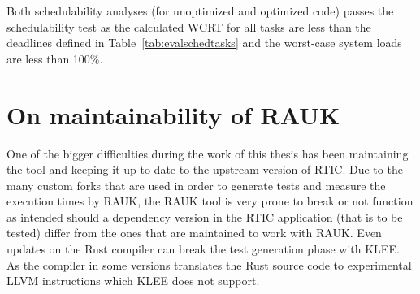 Both schedulability analyses (for unoptimized and optimized code) passes the
schedulability test as the calculated WCRT for all tasks are less than
the deadlines defined in Table~\ref{tab:evalschedtasks} and the worst-case
system loads are less than 100\%.

\section{On maintainability of RAUK}
One of the bigger difficulties during the work of this thesis has been
maintaining the tool and keeping it up to date to the upstream version of RTIC\@.
Due to the many custom forks that are used in order to generate tests and
measure the execution times by RAUK, the RAUK tool is very prone to break or
not function as intended should a dependency version in the RTIC application
(that is to be tested) differ from the ones that are maintained to work with
RAUK\@. Even updates on the Rust compiler can break the test generation phase
with KLEE\@. As the compiler in some versions translates the Rust source code to
experimental LLVM instructions which KLEE does not support.
